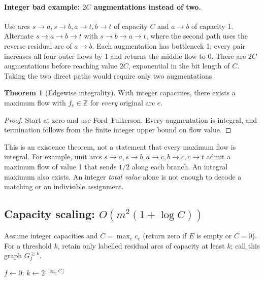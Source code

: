 \documentclass[10pt]{article}
\theoremstyle{definition}
\newtheorem{theorem}[definition]{Theorem}
\begin{document}
\paragraph{Integer bad example: $2C$ augmentations instead of two.}
Use arcs $s\to a,s\to b,a\to t,b\to t$ of capacity $C$ and
$a\to b$ of capacity 1. Alternate $s\to a\to b\to t$ with
$s\to b\to a\to t$, where the second path uses the reverse residual arc
of $a\to b$. Each augmentation has bottleneck 1; every pair increases all
four outer flows by 1 and returns the middle flow to 0. There are $2C$
augmentations before reaching value $2C$, exponential in the bit length of
$C$. Taking the two direct paths would require only two augmentations.

\begin{theorem}[Edgewise integrality]\label{nf:integrality}
With integer capacities, there exists a maximum flow with $f_e\in\mathbb Z$
for \emph{every} original arc $e$.
\end{theorem}
\begin{proof}
Start at zero and use Ford--Fulkerson. Every augmentation is integral, and
termination follows from the finite integer upper bound on flow value.
\end{proof}
This is an existence theorem, not a statement that every maximum flow is
integral. For example, unit arcs $s\to a,s\to b,a\to c,b\to c,c\to t$
admit a maximum flow of value 1 that sends $1/2$ along each branch.
An integral maximum also exists. An integer \emph{total value} alone is not
enough to decode a matching or an indivisible assignment.

\subsection{Capacity scaling: \texorpdfstring{$O(m^2(1+\log C))$}{O(m squared log C)}}\label{nf:scaling}
Assume integer capacities and $C=\max_e c_e$ (return zero if $E$ is empty or
$C=0$). For a threshold $k$, retain only labelled residual arcs of capacity
at least $k$; call this graph $G_f^{\ge k}$.


\begin{algorithm}[H]
\caption{Capacity scaling: augment only through residual capacities $\ge k$}
$f\gets0$; $k\gets2^{\lfloor\log_2 C\rfloor}$\;
\;
\end{algorithm}
\end{document}
